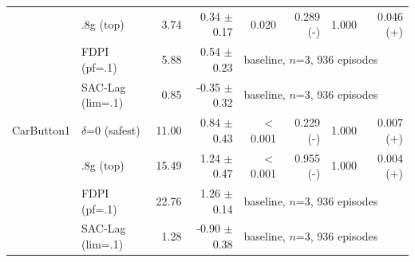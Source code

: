 \begin{tabular}{llrrrrrr}
 & .8g (top) & 3.74 & 0.34 $\pm$ 0.17 & 0.020 & 0.289 (-) & 1.000 & 0.046 (+) \\
 & FDPI (pf=.1) & 5.88 & 0.54 $\pm$ 0.23 & \multicolumn{4}{l}{baseline, $n$=3, 936 episodes} \\
 & SAC-Lag (lim=.1) & 0.85 & -0.35 $\pm$ 0.32 & \multicolumn{4}{l}{baseline, $n$=3, 936 episodes} \\
\midrule
CarButton1 & $\delta$=0 (safest) & 11.00 & 0.84 $\pm$ 0.43 & $<$0.001 & 0.229 (-) & 1.000 & 0.007 (+) \\
 & .8g (top) & 15.49 & 1.24 $\pm$ 0.47 & $<$0.001 & 0.955 (-) & 1.000 & 0.004 (+) \\
 & FDPI (pf=.1) & 22.76 & 1.26 $\pm$ 0.14 & \multicolumn{4}{l}{baseline, $n$=3, 936 episodes} \\
 & SAC-Lag (lim=.1) & 1.28 & -0.90 $\pm$ 0.38 & \multicolumn{4}{l}{baseline, $n$=3, 936 episodes} \\
\bottomrule
\end{tabular}
